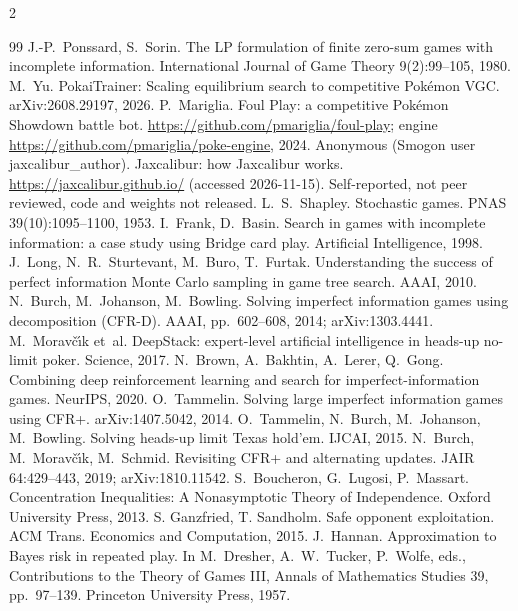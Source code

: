 \documentclass[10pt]{article}
\theoremstyle{plain}
\theoremstyle{definition}
\theoremstyle{remark}
\begin{document}
\begin{multicols}{2}
\begin{thebibliography}{99}\scriptsize
\setlength{\itemsep}{0pt}\setlength{\parsep}{0pt}\setlength{\parskip}{0pt}
 J.-P.~Ponssard, S.~Sorin. The LP formulation of finite zero-sum games with incomplete information. International Journal of Game Theory 9(2):99--105, 1980.
 M.~Yu. PokaiTrainer: Scaling equilibrium search to competitive Pok\'emon VGC. arXiv:2608.29197, 2026.
 P.~Mariglia. Foul Play: a competitive Pok\'emon Showdown battle bot. \url{https://github.com/pmariglia/foul-play}; engine \url{https://github.com/pmariglia/poke-engine}, 2024.
 Anonymous (Smogon user jaxcalibur\_author). Jaxcalibur: how Jaxcalibur works. \url{https://jaxcalibur.github.io/} (accessed 2026-11-15). Self-reported, not peer reviewed, code and weights not released.
 L.~S.~Shapley. Stochastic games. PNAS 39(10):1095--1100, 1953.
 I.~Frank, D.~Basin. Search in games with incomplete information: a case study using Bridge card play. Artificial Intelligence, 1998.
 J.~Long, N.~R.~Sturtevant, M.~Buro, T.~Furtak. Understanding the success of perfect information Monte Carlo sampling in game tree search. AAAI, 2010.
 N.~Burch, M.~Johanson, M.~Bowling. Solving imperfect information games using decomposition (CFR-D). AAAI, pp.~602--608, 2014; arXiv:1303.4441.
 M.~Morav\v{c}\'{\i}k et~al. DeepStack: expert-level artificial intelligence in heads-up no-limit poker. Science, 2017.
 N.~Brown, A.~Bakhtin, A.~Lerer, Q.~Gong. Combining deep reinforcement learning and search for imperfect-information games. NeurIPS, 2020.
 O.~Tammelin. Solving large imperfect information games using CFR+. arXiv:1407.5042, 2014.
 O.~Tammelin, N.~Burch, M.~Johanson, M.~Bowling. Solving heads-up limit Texas hold'em. IJCAI, 2015.
 N.~Burch, M.~Morav\v{c}\'{\i}k, M.~Schmid. Revisiting CFR+ and alternating updates. JAIR 64:429--443, 2019; arXiv:1810.11542.
 S.~Boucheron, G.~Lugosi, P.~Massart. Concentration Inequalities: A Nonasymptotic Theory of Independence. Oxford University Press, 2013.
 S. Ganzfried, T. Sandholm. Safe opponent exploitation. ACM Trans. Economics and Computation, 2015.
 J.~Hannan. Approximation to Bayes risk in repeated play. In M.~Dresher, A.~W.~Tucker, P.~Wolfe, eds., Contributions to the Theory of Games III, Annals of Mathematics Studies 39, pp.~97--139. Princeton University Press, 1957.

\end{thebibliography}
\end{multicols}
\end{document}
